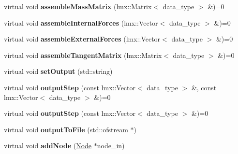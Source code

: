 \begin{CompactItemize}
\item 
\hypertarget{classmknix_1_1FlexBody_3c945ec9e62ffc199c0198d0b9c60029}{
virtual void \textbf{assembleMassMatrix} (lmx::Matrix$<$ data\_\-type $>$ \&)=0}
\label{classmknix_1_1FlexBody_3c945ec9e62ffc199c0198d0b9c60029}

\item 
\hypertarget{classmknix_1_1FlexBody_1ceddaab1c7db6fadd4eb8bfd3a30c48}{
virtual void \textbf{assembleInternalForces} (lmx::Vector$<$ data\_\-type $>$ \&)=0}
\label{classmknix_1_1FlexBody_1ceddaab1c7db6fadd4eb8bfd3a30c48}

\item 
\hypertarget{classmknix_1_1FlexBody_c27d67209359f938c10b66706137732f}{
virtual void \textbf{assembleExternalForces} (lmx::Vector$<$ data\_\-type $>$ \&)=0}
\label{classmknix_1_1FlexBody_c27d67209359f938c10b66706137732f}

\item 
\hypertarget{classmknix_1_1FlexBody_f661699307694d1dd08b892132416ad7}{
virtual void \textbf{assembleTangentMatrix} (lmx::Matrix$<$ data\_\-type $>$ \&)=0}
\label{classmknix_1_1FlexBody_f661699307694d1dd08b892132416ad7}

\item 
\hypertarget{classmknix_1_1FlexBody_b863f9c782ccffbcea5c5e485fff52bc}{
virtual void \textbf{setOutput} (std::string)}
\label{classmknix_1_1FlexBody_b863f9c782ccffbcea5c5e485fff52bc}

\item 
\hypertarget{classmknix_1_1FlexBody_7660a5136822ba11889b9650872ad093}{
virtual void \textbf{outputStep} (const lmx::Vector$<$ data\_\-type $>$ \&, const lmx::Vector$<$ data\_\-type $>$ \&)=0}
\label{classmknix_1_1FlexBody_7660a5136822ba11889b9650872ad093}

\item 
\hypertarget{classmknix_1_1FlexBody_3666a6abde087fb97eee2077af231570}{
virtual void \textbf{outputStep} (const lmx::Vector$<$ data\_\-type $>$ \&)=0}
\label{classmknix_1_1FlexBody_3666a6abde087fb97eee2077af231570}

\item 
\hypertarget{classmknix_1_1FlexBody_1cf57f024248bbb196e91aac9b9ab9fe}{
virtual void \textbf{outputToFile} (std::ofstream $\ast$)}
\label{classmknix_1_1FlexBody_1cf57f024248bbb196e91aac9b9ab9fe}

\item 
\hypertarget{classmknix_1_1FlexBody_05c7a81425fa8d2fa3dc313fe756f58b}{
virtual void \textbf{addNode} (\hyperlink{classmknix_1_1Node}{Node} $\ast$node\_\-in)}
\label{classmknix_1_1FlexBody_05c7a81425fa8d2fa3dc313fe756f58b}


\end{CompactItemize}
